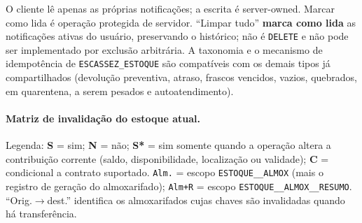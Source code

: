 \begin{regra}
O cliente lê apenas as próprias notificações; a escrita é server-owned. Marcar como lida é operação protegida de servidor. ``Limpar tudo'' \textbf{marca como lida} as notificações ativas do usuário, preservando o histórico; não é \texttt{DELETE} e não pode ser implementado por exclusão arbitrária. A taxonomia e o mecanismo de idempotência de \texttt{ESCASSEZ\_ESTOQUE} são compatíveis com os demais tipos já compartilhados (devolução preventiva, atraso, frascos vencidos, vazios, quebrados, em quarentena, a serem pesados e autoatendimento).
\end{regra}

\paragraph{Matriz de invalidação do estoque atual.}
Legenda: \textbf{S} = sim; \textbf{N} = não; \textbf{S*} = sim somente quando a operação altera a contribuição corrente (saldo, disponibilidade, localização ou validade); \textbf{C} = condicional a contrato suportado. \texttt{Alm.} = escopo \texttt{ESTOQUE\_\_ALMOX} (mais o registro de geração do almoxarifado); \texttt{Alm+R} = escopo \texttt{ESTOQUE\_\_ALMOX\_\_RESUMO}. ``Orig.$\to$dest.'' identifica os almoxarifados cujas chaves são invalidadas quando há transferência.

